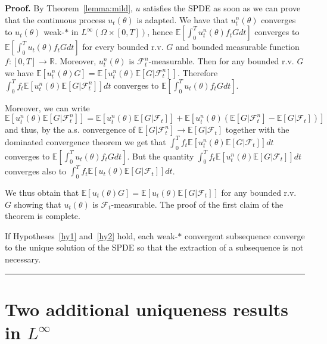 \documentclass[a4paper,11pt]{article}
\newenvironment{proof}[1][Proof]{\textbf{#1.} }{\ \rule{0.5em}{0.5em}}
\begin{document}
\begin{proof}
By Theorem~\ref{lemma:mild}, $u$ satisfies the SPDE as soon as we can prove
that the continuous process $u_{t}(\theta )$ is adapted. We have that $%
u_{t}^{n}(\theta )$ converges to $u_{t}(\theta )$ weak-$*$ in $L^{\infty
}(\Omega \times \left[ 0,T\right] )$, hence $\mathbb{E}\left[
\int_{0}^{T}u_{t}^{n}(\theta )f_{t}Gdt\right] $ converges to $\mathbb{E}%
\left[ \int_{0}^{T}u_{t}(\theta )f_{t}Gdt\right] $ for every bounded r.v. $G$
and bounded measurable function $f:\left[ 0,T\right] \rightarrow \mathbb{R}$.
Moreover, $u_{t}^{n}(\theta )$ is $\mathcal{F}_{t}^{n}$-measurable. Then for
any bounded r.v. $G$ we have $\mathbb{E}[u_{t}^{n}(\theta )G]=\mathbb{E}%
[u_{t}^{n}(\theta )\mathbb{E}[G|\mathcal{F}_{t}^{n}]]$. Therefore $%
\int_{0}^{T}f_{t}\mathbb{E}[u_{t}^{n}(\theta )\mathbb{E}[G|\mathcal{F}%
_{t}^{n}]]dt$ converges to $\mathbb{E}\left[ \int_{0}^{T}u_{t}(\theta
)f_{t}Gdt\right] $.

Moreover, we can write
\begin{equation*}
\mathbb{E}[u_{t}^{n}(\theta )\mathbb{E}[G|\mathcal{F}_{t}^{n}]]=\mathbb{E}%
[u_{t}^{n}(\theta )\mathbb{E}[G|\mathcal{F}_{t}]]+\mathbb{E}%
[u_{t}^{n}(\theta )(\mathbb{E}[G|\mathcal{F}_{t}^{n}]-\mathbb{E}[G|\mathcal{F%
}_{t}])]
\end{equation*}
and thus, by the a.s. convergence of $\mathbb{E}[G|\mathcal{F}%
_{t}^{n}]\rightarrow \mathbb{E}[G|\mathcal{F}_{t}]$ together with the
dominated convergence theorem we get that $\int_{0}^{T}f_{t}\mathbb{E}%
[u_{t}^{n}(\theta )\mathbb{E}[G|\mathcal{F}_{t}]]dt$ converges to $\mathbb{E}%
[ \int_{0}^{T}u_{t}(\theta )f_{t}Gdt] $. But the quantity $\int_{0}^{T}f_{t}%
\mathbb{E}[u_{t}^{n}(\theta )\mathbb{E}[G|\mathcal{F}_{t}]]dt$ converges
also to $\int_{0}^{T}f_{t}\mathbb{E}[u_{t}(\theta )\mathbb{E}[G|\mathcal{F}%
_{t}]]dt$.

We thus obtain that $\mathbb{E}[u_{t}(\theta )G]=\mathbb{E}[u_{t}(\theta )%
\mathbb{E}[G|\mathcal{F}_{t}]]$ for any bounded r.v. $G$ showing that $%
u_{t}(\theta )$ is $\mathcal{F}_{t}$-measurable. The proof of the first
claim of the theorem is complete.

If Hypotheses~\ref{hy1} and~\ref{hy2} hold, each weak-$\ast$ convergent
subsequence converge to the unique solution of the SPDE so that the
extraction of a subsequence is not necessary.
\end{proof}


\section{Two additional uniqueness results in $L^\infty$}
\label{sec:fractional}
\end{document}

